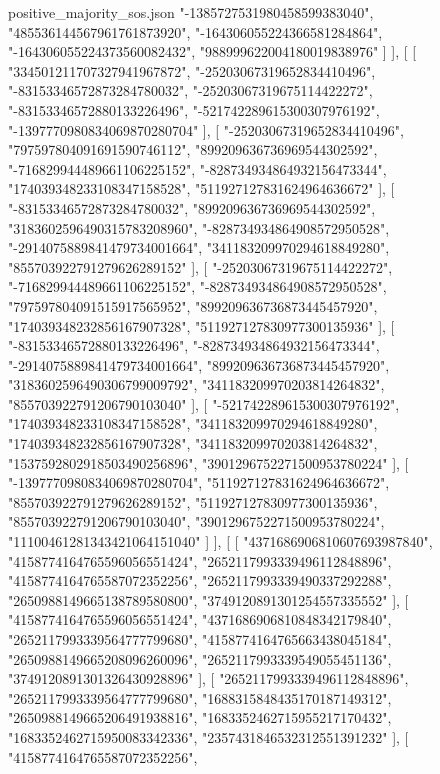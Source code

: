 \begin{filecontents*}[overwrite]{positive_majority_sos.json}
    "-1385727531980458599383040",
    "485536144567961761873920",
    "-164306055224366581284864",
    "-164306055224373560082432",
    "988999622004180019838976"
   ]
  ],
  [
   [
    "334501211707327941967872",
    "-25203067319652834410496",
    "-83153346572873284780032",
    "-25203067319675114422272",
    "-83153346572880133226496",
    "-521742289615300307976192",
    "-1397770980834069870280704"
   ],
   [
    "-25203067319652834410496",
    "797597804091691590746112",
    "899209636736969544302592",
    "-716829944489661106225152",
    "-828734934864932156473344",
    "174039348233108347158528",
    "511927127831624964636672"
   ],
   [
    "-83153346572873284780032",
    "899209636736969544302592",
    "3183602596490315783208960",
    "-828734934864908572950528",
    "-2914075889841479734001664",
    "341183209970294618849280",
    "855703922791279626289152"
   ],
   [
    "-25203067319675114422272",
    "-716829944489661106225152",
    "-828734934864908572950528",
    "797597804091515917565952",
    "899209636736873445457920",
    "174039348232856167907328",
    "511927127830977300135936"
   ],
   [
    "-83153346572880133226496",
    "-828734934864932156473344",
    "-2914075889841479734001664",
    "899209636736873445457920",
    "3183602596490306799009792",
    "341183209970203814264832",
    "855703922791206790103040"
   ],
   [
    "-521742289615300307976192",
    "174039348233108347158528",
    "341183209970294618849280",
    "174039348232856167907328",
    "341183209970203814264832",
    "1537592802918503490256896",
    "3901296752271500953780224"
   ],
   [
    "-1397770980834069870280704",
    "511927127831624964636672",
    "855703922791279626289152",
    "511927127830977300135936",
    "855703922791206790103040",
    "3901296752271500953780224",
    "11100461281343421064151040"
   ]
  ],
  [
   [
    "4371686906810607693987840",
    "4158774164765596056551424",
    "2652117993339496112848896",
    "4158774164765587072352256",
    "2652117993339490337292288",
    "2650988149665138789580800",
    "3749120891301254557335552"
   ],
   [
    "4158774164765596056551424",
    "4371686906810848342179840",
    "2652117993339564777799680",
    "4158774164765663438045184",
    "2650988149665208096260096",
    "2652117993339549055451136",
    "3749120891301326430928896"
   ],
   [
    "2652117993339496112848896",
    "2652117993339564777799680",
    "1688315848435170187149312",
    "2650988149665206491938816",
    "1683352462715955217170432",
    "1683352462715950083342336",
    "2357431846532312551391232"
   ],
   [
    "4158774164765587072352256",

\end{filecontents*}
